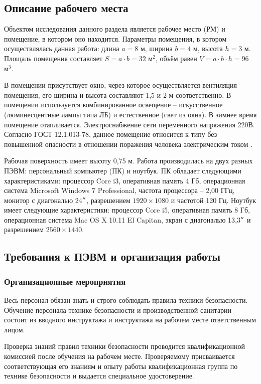 \subsection{Описание рабочего места}

Объектом исследования данного раздела является рабочее место (РМ) и помещение, в котором оно находится. 
Параметры помещения, в котором осуществлялась данная работа: длина $a = 8$ м, ширина $b = 4$ м, высота $h = 3$ м. 
Площаль помещения составляет $S = a \cdot b = 32$ $\text{м}^2$, объём равен $V = a \cdot b \cdot h = 96$~$\text{м}^3$.

В помещении присутствует окно, через которое осуществляется вентиляция помещения, его ширина и высота составляют 1,5 и 2 м соответственно.
В помещении используется комбинированное освещение -- искусственное (люминесцентные лампы типа ЛБ) и естественное (свет из окна). 
В зимнее время помещение отапливается. 
Электроснабжение сети переменного напряжения 220В. 
Согласно ГОСТ 12.1.013-78, данное помещение относится к типу без повышенной опасности в отношении поражения человека электрическим током \cite{Gost2001}.

Рабочая поверхность имеет высоту 0,75 м.
Работа производилась на двух разных ПЭВМ: персональный компьютер (ПК) и ноутбук.
ПК обладает следующими характеристиками: процессор Core i3, оперативная память 4 Гб, операционная система Microsoft Windows 7 Professional, частота процессора – 2,00 ГГц, монитор с диагональю 24$"$, разрешением $1920 \times 1080$ и частотой 120 Гц.
Ноутбук имеет следующие характеристики: процессор Core i5, оперативная память 8 Гб, операционная система Mac OS X 10.11 El Capitan, экран с диагональю 13,3$"$ и разрешением $2560 \times 1440$.


\subsection{Требования к ПЭВМ и организация работы}

\subsubsection{Организационные мероприятия} %

Весь персонал обязан знать и строго соблюдать правила техники безопасности. 
Обучение персонала технике безопасности и производственной санитарии состоит из вводного инструктажа и инструктажа на рабочем месте ответственным лицом.

Проверка знаний правил техники безопасности проводится квалификационной комиссией после обучения на рабочем месте.
Проверяемому присваивается соответствующая его знаниям и опыту работы квалификационная группа по технике безопасности и выдается специальное удостоверение.

